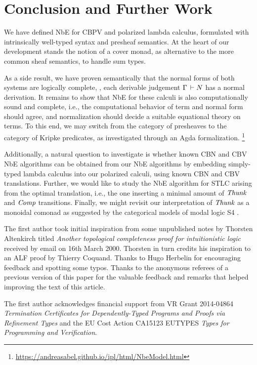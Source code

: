 \documentclass[sigplan,screen,fleqn,review]{acmart} %
\begin{document}
\section{Conclusion and Further Work}
\label{sec:concl}

We have defined NbE for CBPV and polarized lambda calculus,
formulated with intrinsically well-typed syntax and presheaf
semantics.  At the heart of our development stands the notion of a
cover monad, as alternative to the more common sheaf semantics, to
handle sum types.

As a side result, we have proven semantically
that the normal forms of both systems are logically complete, \ie,
each derivable judgement $\Gamma \,\vdash N$ has a normal derivation.
It remains to show that NbE for these calculi is also computationally
sound and complete, i.e., the computational behavior of term and
normal form should agree, and normalization should decide a suitable
equational theory on terms.  To this end, we may switch from the
category of presheaves to the category of Kripke predicates, as
investigated through an Agda formalization.%
\footnote{\url{https://andreasabel.github.io/ipl/html/NbeModel.html}}

Additionally, a natural question to investigate is whether known CBN
and CBV NbE algorithms can be obtained from our NbE algorithms by
embedding simply-typed lambda calculus into our polarized calculi,
using known CBN and CBV translations.  Further, we would like to study
the NbE algorithm for STLC arising from the optimal translation, i.e.,
the one inserting a minimal amount of $\mathit{Thunk}$ and $\mathit{Comp}$ transitions.
Finally, we might revisit our interpretation of $\mathit{Thunk}$ as a monoidal
comonad as suggested by the categorical models of modal logic S4
\cite{alechinaMendlerDePaivaRitter:csl01}.

\begin{acks}
The first author took initial inspiration from some
  unpublished notes by Thorsten Altenkirch titled
\emph{Another topological completeness proof for intuitionistic logic}
received by email on 16th March 2000.
Thorsten in turn credits his inspiration to an ALF proof by Thierry
Coquand.  Thanks to Hugo Herbelin for encouraging feedback and spotting some
typos.  Thanks to the anonymous referees of a previous version of this
paper for the valuable feedback and remarks that helped improving the
text of this article.

The first author acknowledges financial support from
VR Grant 2014-04864 \emph{Termination
      Certificates for Dependently-Typed Programs and Proofs via
      Refinement Types}
and the EU Cost Action CA15123 EUTYPES \emph{Types for Programming and Verification}.
\end{acks}




\end{document}
